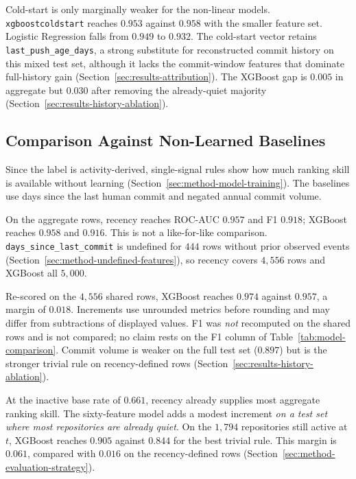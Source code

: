 Cold-start is only marginally weaker for the non-linear models.
\texttt{xgboost\sdash cold\sdash start} reaches \(0.953\) against \(0.958\)
with the smaller feature set. Logistic Regression falls from \(0.949\) to
\(0.932\). The cold-start vector retains
\texttt{last\_push\_age\_days}, a strong substitute for reconstructed commit
history on this mixed test set, although it lacks the commit-window features
that dominate full-history gain (Section~\ref{sec:results-attribution}). The
XGBoost gap is \(0.005\) in aggregate but \(0.030\) after removing the
already-quiet majority
(Section~\ref{sec:results-history-ablation}).

\subsection{Comparison Against Non-Learned Baselines}
\label{sec:results-baselines}

Since the label is activity-derived, single-signal rules show how much ranking
skill is available without learning
(Section~\ref{sec:method-model-training}). The baselines use days since the last
human commit and negated annual commit volume.

On the aggregate rows, recency reaches ROC-AUC \(0.957\) and F1 \(0.918\);
XGBoost reaches \(0.958\) and \(0.916\). This is not a like-for-like comparison.
\texttt{days\_since\_last\_commit} is undefined for \(444\) rows without prior
observed events (Section~\ref{sec:method-undefined-features}), so recency covers
\(4{,}556\) rows and XGBoost all \(5{,}000\).

Re-scored on the \(4{,}556\) shared rows, XGBoost reaches \(0.974\) against
\(0.957\), a margin of \(0.018\). Increments use unrounded metrics before
rounding and may differ from subtractions of displayed values. F1 was \emph{not}
recomputed on the shared rows and is not compared; no claim rests on the F1
column of Table~\ref{tab:model-comparison}. Commit volume is weaker on the full
test set (\(0.897\)) but is the stronger trivial rule on recency-defined rows
(Section~\ref{sec:results-history-ablation}).

At the inactive base rate of \(0.661\), recency already supplies most
aggregate ranking skill. The sixty-feature model adds a modest increment
\emph{on a test set where most repositories are
already quiet}. On the
\(1{,}794\) repositories still active at \(t\), XGBoost reaches \(0.905\)
against \(0.844\) for the best trivial rule. This margin is \(0.061\), compared
with \(0.016\) on the recency-defined rows
(Section~\ref{sec:method-evaluation-strategy}).

